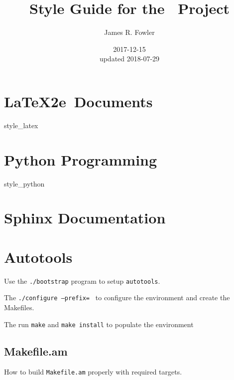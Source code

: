 \documentclass{book}
\begin{document}
\title{Style Guide for the \ProjectTitle\ Project}
\author{James R. Fowler}
\date{2017-12-15\\ updated 2018-07-29}

\maketitle

\tableofcontents

\chapter{\LaTeX2e\ Documents}
{style_latex}

\chapter{Python Programming}
{style_python}

\chapter{Sphinx Documentation}

\chapter{Autotools}
Use the \texttt{./bootstrap} program to setup \texttt{autotools}.

The \texttt{./configure --prefix=~} to configure the environment
and create the Makefiles.

The run \texttt{make} and \texttt{make install} to populate the
environment

\section{Makefile.am}

How to build \texttt{Makefile.am} properly with required targets.

\printbibliography
\end{document}
